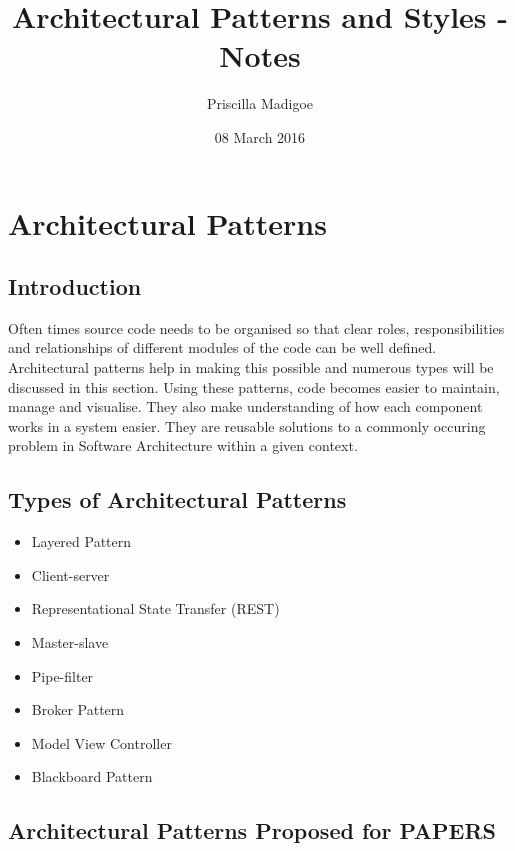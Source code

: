 \documentclass[a4paper,12pt]{article}
\begin{document}
\title{Architectural Patterns and Styles - Notes}
\author{Priscilla Madigoe}
\date{08 March 2016}
\maketitle
 
\section{Architectural Patterns}

\subsection{Introduction}
Often times source code needs to be organised so that clear roles, responsibilities and relationships of different modules of the code can be well defined. Architectural patterns help in making this possible and numerous types will be discussed in this section. Using these patterns, code becomes easier to maintain, manage and visualise. They also make understanding of how each component works in a system easier. They are reusable solutions to a commonly occuring problem in Software Architecture within a given context.

\subsection{Types of Architectural Patterns}

\begin{itemize}
\item Layered Pattern
\item Client-server
\item Representational State Transfer (REST)
\item Master-slave
\item Pipe-filter
\item Broker Pattern
\item Model View Controller
\item Blackboard Pattern
\end{itemize}

\subsection{Architectural Patterns Proposed for PAPERS}
\end{document}
